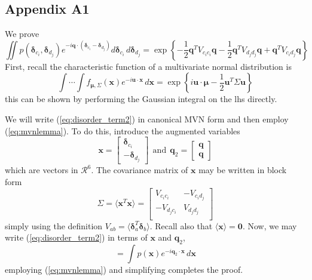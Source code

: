\documentclass{article}
\begin{document}
\subsection{Appendix A1}
We prove
\begin{equation}
\iint p( \boldsymbol{\delta}_{c_i},  \boldsymbol{\delta}_{d_j} )
e^{-i \mathbf{q} \cdot ( \boldsymbol{\delta}_{c_i}  - \boldsymbol{\delta}_{d_j})} 
d \boldsymbol{\delta}_{c_i}  \, d \boldsymbol{\delta}_{d_j}
=
\exp \left\{
- \frac{1}{2} \mathbf{q}^T V_{c_i c_i} \mathbf{q}
- \frac{1}{2} \mathbf{q}^T V_{d_j d_j} \mathbf{q}
+ \mathbf{q}^T V_{c_i d_j} \mathbf{q}
\right\}
\label{eq:disorder_term2}
\end{equation}
First, recall the characteristic function of a multivariate normal distribution is
\begin{equation}
\int \cdots \int f_{\boldsymbol{\mu}, \Sigma}(\mathbf{x}) e^{-i \mathbf{u} \cdot \mathbf{x}} \, d \mathbf{x}
= \exp \left\{ i \mathbf{u} \cdot \boldsymbol{\mu} - \frac{1}{2} \mathbf{u}^T \Sigma \mathbf{u} \right\}
\label{eq:mvnlemma}
\end{equation}
this can be shown by performing the Gaussian integral on the lhs directly.

We will write (\ref{eq:disorder_term2}) in canonical MVN form and then employ (\ref{eq:mvnlemma}). To do this, introduce the augmented variables
\[
\mathbf{x} = 
\begin{bmatrix}
\boldsymbol{\delta}_{c_i} \\
- \boldsymbol{\delta}_{d_j}
\end{bmatrix}
%
\ \ \mathrm{and} \ \
%
\mathbf{q}_2 = 
\begin{bmatrix}
\mathbf{q} \\
\mathbf{q}
\end{bmatrix}
\]
which are vectors in $\mathcal{R}^6$. The covariance matrix of $\mathbf{x}$ may be written in block form
\[
\Sigma = 
\langle \mathbf{x}^T  \mathbf{x} \rangle = 
\begin{bmatrix}
V_{{c_i}{c_i}} & -V_{{c_i}{d_j}} \\
-V_{{d_j}{c_i}} & V_{{d_j}{d_j}} \\
\end{bmatrix}
\]
simply using the definition $V_{ab} = \langle \boldsymbol{\delta}_{a}^T\boldsymbol{\delta}_{b} \rangle$. Recall also that $\langle \mathbf{x} \rangle = \mathbf{0}$. Now, we may write (\ref{eq:disorder_term2}) in terms of $\mathbf{x}$ and $\mathbf{q}_2$,
\[
= \int p(\mathbf{x} ) e^{- i \mathbf{q}_2 \cdot \mathbf{x} } \, d \mathbf{x}
\]
employing (\ref{eq:mvnlemma}) and simplifying completes the proof.
\end{document}
